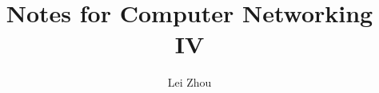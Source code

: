 \documentclass{article}
\begin{document}
\title{Notes for Computer Networking IV}
\author{Lei Zhou}
\maketitle

%

%

%


\end{document}
